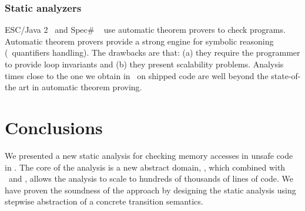 \documentclass[10pt]{sigplanconf}
\begin{document}
\subsubsection*{Static analyzers}
ESC/Java 2~\cite{ESCJava2} and Spec\# ~\cite{specsharp} use automatic
theorem provers to check programs.  Automatic theorem provers provide
a strong engine for symbolic reasoning (\eg\ quantifiers handling).
The drawbacks are that: (a) they require the programmer to provide
loop invariants and (b) they present scalability problems.  Analysis
times close to the one we obtain in \Clousot\ on shipped code are well
beyond the state-of-the art in automatic theorem proving.


\section{Conclusions}
We presented a new static analysis for checking memory accesses in
unsafe code in \NET.  The core of the analysis is a new abstract
domain, \Stripes, which combined with \Intervals\ and
\Karr, allows the analysis to scale to hundreds of thousands of lines
of code.  We have proven the soundness of the approach by designing
the static analysis using stepwise abstraction of a concrete transition
semantics.
\end{document}
